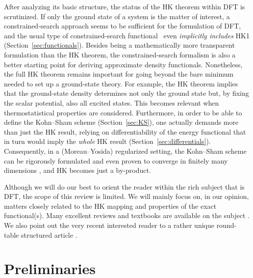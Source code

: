 \documentclass[journal=apcach,manuscript=article,layout=twocolumn]{achemso}
\newcommand{\changed}[1] {{ {#1}}} %
\begin{document}
After analyzing its basic structure, the status of the HK theorem within DFT is scrutinized. If only the ground state of a system is the matter of interest, a constrained-search approach seems to be sufficient for the formulation of DFT, and the usual type of constrained-search functional~\changed{\cite{percus1978,Levy79}} even \emph{implicitly includes} HK1 (Section~\ref{sec:functionals}). \changed{Besides being a mathematically more transparent formulation than the HK theorem, the constrained-search formalism is also a better starting point for deriving approximate density functionals. Nonetheless, the full HK theorem remains important for going beyond the bare minimum needed to set up a ground-state theory. For example, the HK theorem implies that the ground-state density determines not only the ground state but, by fixing the scalar potential, also all excited states. This becomes relevant when  thermostatistical properties are considered. Furthermore,} in order to be able to define the Kohn--Sham scheme (Section~\ref{sec:KS}), one actually demands \changed{more than} just the HK result, relying on differentiability of the energy functional that in turn would imply the \emph{whole} HK result (Section~\ref{sec:differentials}). Consequently, in a (Moreau--Yosida) regularized setting, the Kohn--Sham scheme can be rigorously formulated and even proven to converge in finitely many dimensions \cite{penz2019guaranteed,penz2020erratum,Kvaal2022-MY}, and HK becomes just a by-product.

Although we will do our best to orient the reader within the rich subject that is DFT, the scope of this review is limited. We will mainly focus on, in our opinion, matters closely related to the \changed{HK} mapping and properties of the exact functional(s). Many excellent reviews and textbooks are available on the subject \cite{vonBarth2004basic,burke2007abc,burke2012perspective,dreizler2012-book,eschrig2003-book,parr}. We also point out the very recent interested reader to a rather unique round-table structured article \cite{teale2022round-table}.

\section{Preliminaries}
\label{sec:prelim}
\end{document}
